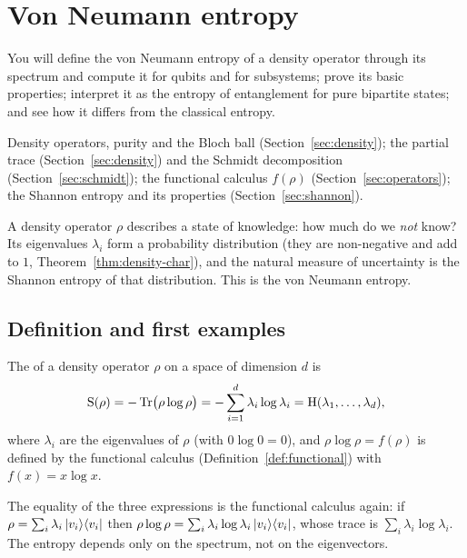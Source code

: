 \section{Von Neumann entropy}\label{sec:vonneumann}

\begin{objectives}
  You will define the von Neumann entropy of a density operator through its spectrum and compute it for qubits and for subsystems; prove its basic properties; interpret it as the entropy of entanglement for pure bipartite states; and see how it differs from the classical entropy.
\end{objectives}

\begin{recall}
  Density operators, purity and the Bloch ball (Section~\ref{sec:density}); the partial trace (Section~\ref{sec:density}) and the Schmidt decomposition (Section~\ref{sec:schmidt}); the functional calculus $f(\rho)$ (Section~\ref{sec:operators}); the Shannon entropy and its properties (Section~\ref{sec:shannon}).
\end{recall}

A density operator $\rho$ describes a state of knowledge: how much do we \emph{not} know? Its eigenvalues $\lambda_i$ form a probability distribution (they are non-negative and add to $1$, Theorem~\ref{thm:density-char}), and the natural measure of uncertainty is the Shannon entropy of that distribution. This is the von Neumann entropy.

\subsection{Definition and first examples}

\begin{definition}\label{def:vn}
  The  of a density operator $\rho$ on a space of dimension $d$ is
  \[
    \mathrm{S}(\rho)=-\operatorname{Tr}\bigl(\rho\log\rho\bigr)=-\sum_{i=1}^d\lambda_i\log\lambda_i=\mathrm{H}(\lambda_1,\dots,\lambda_d),
  \]
  where $\lambda_i$ are the eigenvalues of $\rho$ (with $0\log0=0$), and $\rho\log\rho=f(\rho)$ is defined by the functional calculus (Definition~\ref{def:functional}) with $f(x)=x\log x$.
\end{definition}

The equality of the three expressions is the functional calculus again: if $\rho=\sum_i\lambda_i\left|v_i\right\rangle\!\left\langle v_i\right|$ then $\rho\log\rho=\sum_i\lambda_i\log\lambda_i\left|v_i\right\rangle\!\left\langle v_i\right|$, whose trace is $\sum_i\lambda_i\log\lambda_i$. The entropy depends only on the spectrum, not on the eigenvectors.


